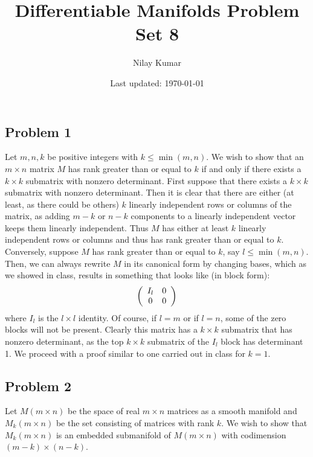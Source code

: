 \documentclass{../../mathnotes}
\title{Differentiable Manifolds Problem Set 8}
\author{Nilay Kumar}
\date{Last updated: \today}
\begin{document}
\maketitle

\subsection*{Problem 1}

Let $m,n,k$ be positive integers with $k\leq\min(m,n)$. We wish to show that an $m\times n$ matrix $M$ has rank greater
than or equal to $k$ if and only if there exists a $k\times k$ submatrix with nonzero determinant.
First suppose that there exists a $k\times k$ submatrix with nonzero determinant. Then it is clear that
there are either (at least, as there could be others) $k$ linearly independent rows or columns of the matrix, as adding $m-k$ or $n-k$ components
to a linearly independent vector keeps them linearly independent. Thus $M$ has either at least $k$ linearly independent rows
or columns and thus has rank greater than or equal to $k$.
Conversely, suppose $M$ has rank greater than or equal to $k$, say $l\leq \min(m,n)$. Then, we can always rewrite $M$ in its canonical form
by changing bases, which as we showed in class, results in something that looks like (in block form):
\begin{align*}
    \left(\begin{array}[]{cc}
        I_l & 0 \\
        0 & 0
    \end{array}\right)
\end{align*}
where $I_l$ is the $l\times l$ identity. Of course, if $l=m$ or if $l=n$, some of the zero blocks will not be present.
Clearly this matrix has a $k\times k$ submatrix that has nonzero determinant, as the top $k\times k$ submatrix of the
$I_l$ block has determinant 1. We proceed with a proof similar to one carried out in class for $k=1$.


\subsection*{Problem 2}

Let $M(m\times n)$ be the space of real $m\times n$ matrices as a smooth manifold and $M_k(m\times n)$ be the set
consisting of matrices with rank $k$. We wish to show that $M_k(m\times n)$ is an embedded submanifold of $M(m\times n)$
with codimension $(m-k)\times (n-k)$.
\end{document}
